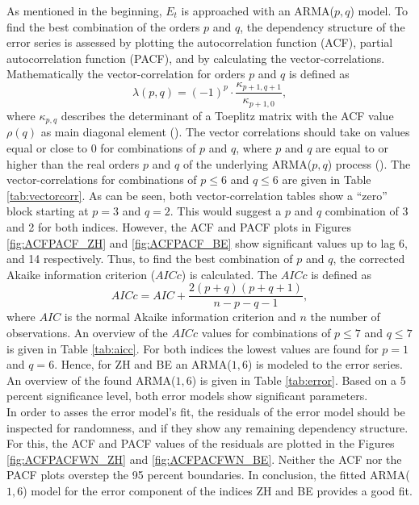 \documentclass[11pt]{article}
\begin{document}
As mentioned in the beginning, \(E_t\) is approached with an ARMA(\(p,q\)) model. To find the best combination of the orders \(p\) and \(q\), the dependency structure of the error series is assessed by plotting the autocorrelation function (ACF), partial autocorrelation function (PACF), and by calculating the vector-correlations. Mathematically the vector-correlation for orders \(p\) and \(q\) is defined as
\begin{equation}
\lambda(p,q)=(-1)^p\cdot\frac{\kappa_{p+1,q+1}}{\kappa_{p+1,0}},
\label{eq:vectorcorrelation}
\end{equation}
where \(\kappa_{p,q}\) describes the determinant of a Toeplitz matrix with the ACF value \(\rho(q)\) as main diagonal element (\cite{schlittTHEORY}).
The vector correlations should take on values equal or close to 0 for combinations of \(p\) and \(q\), where \(p\) and \(q\) are equal to or higher than the real orders \(p\) and \(q\) of the underlying ARMA(\(p,q\)) process (\cite{schlittTHEORY}).
The vector-correlations for combinations of \(p\leq6\) and \(q\leq6\) are given in Table \ref{tab:vectorcorr}. As can be seen, both vector-correlation tables show a ``zero'' block starting at \(p=3\) and \(q=2\). This would suggest a \(p\) and \(q\) combination of 3 and 2 for both indices. However, the ACF and PACF plots in Figures \ref{fig:ACFPACF_ZH} and \ref{fig:ACFPACF_BE} show significant values up to lag 6, and 14 respectively. Thus, to find the best combination of \(p\) and \(q\), the corrected Akaike information criterion (\(AICc\)) is calculated. The \(AICc\) is defined as
\begin{equation}
 AICc=AIC+\frac{2(p+q)(p+q+1)}{n-p-q-1},
\end{equation}
where \(AIC\) is the normal Akaike information criterion and \(n\) the number of observations. An overview of the \(AICc\) values for combinations of \(p\leq7\) and \(q\leq7\) is given in Table \ref{tab:aicc}. For both indices the lowest values are found for \(p=1\) and \(q=6\). Hence, for ZH and BE an ARMA(\(1,6\)) is modeled to the error series. An overview of the found ARMA(\(1,6\)) is given in Table \ref{tab:error}. Based on a 5 percent significance level, both error models show significant parameters.
\\
In order to asses the error model's fit, the residuals of the error model should be inspected for randomness, and if they show any remaining dependency structure. For this, the ACF and PACF values of the residuals are plotted in the Figures \ref{fig:ACFPACFWN_ZH} and \ref{fig:ACFPACFWN_BE}. Neither the ACF nor the PACF plots overstep the 95 percent boundaries. In conclusion, the fitted ARMA(\(1,6\)) model for the error component of the indices ZH and BE provides a good fit.
\end{document}
